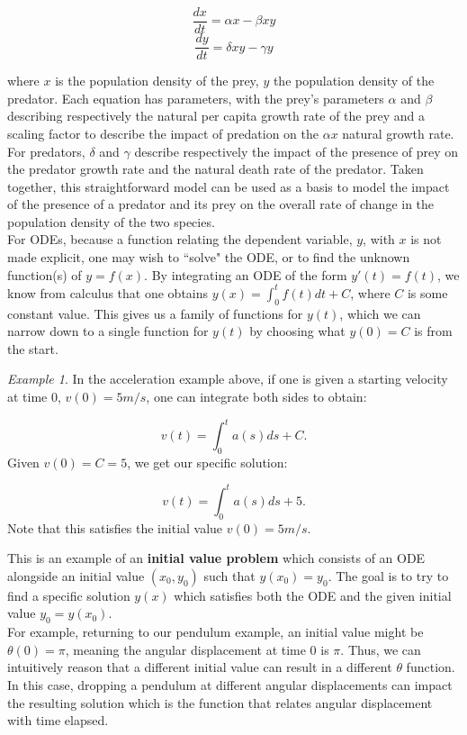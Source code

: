 \documentclass{article}
\theoremstyle{remark}
\newtheorem{example}{Example}
\begin{document}
$$\frac{dx}{dt} = \alpha x - \beta xy$$
$$\frac{dy}{dt} = \delta xy - \gamma y$$

\noindent where $x$ is the population density of the prey, $y$ the population density of the predator. Each equation has parameters, with the prey's parameters $\alpha$ and $\beta$ describing respectively the natural per capita growth rate of the prey and a scaling factor to describe the impact of predation on the $\alpha x$ natural growth rate. For predators, $\delta$ and $\gamma$ describe respectively the impact of the presence of prey on the predator growth rate and the natural death rate of the predator. Taken together, this straightforward model can be used as a basis to model the impact of the presence of a predator and its prey on the overall rate of change in the population density of the two species. \\

For ODEs, because a function relating the dependent variable, $y$, with $x$ is not made explicit, one may wish to ``solve" the ODE, or to find the unknown function(s) of $y=f(x)$. By integrating an ODE of the form $y'(t) = f(t)$, we know from calculus that one obtains $y(x) = \int_0^t f(t) dt + C$, where $C$ is some constant value. This  gives us a family of functions for $y(t)$, which we can narrow down to a single function for $y(t)$ by choosing what $y(0) = C$ is from the start.\\
\begin{example}
In the acceleration example above, if one is given a starting velocity at time 0, $v(0) = 5m/s$, one can integrate both sides to obtain:

$$v(t) = \int_0^ta(s)ds + C.$$
Given $ v(0) = C = 5$, we get our specific solution:

$$v(t) = \int_0^ta(s)ds + 5.$$
Note that this satisfies the initial value $v(0) = 5m/s$. 

\end{example}

This is an example of an \textbf{initial value problem} which consists of an ODE alongside an initial value $(x_0, y_0)$ such that $y(x_0) = y_0$. The goal is to try to find a specific solution $y(x)$ which satisfies  both the ODE and the given initial value $y_0 = y(x_0)$.  \\


For example, returning to our pendulum example, an initial value might be $\theta(0) = \pi$, meaning the angular displacement at time 0 is $\pi$. Thus, we can intuitively reason that a different initial value can result in a different $\theta$ function. In this case, dropping a pendulum at different angular displacements can impact the resulting solution which is the function that relates angular displacement with time elapsed. \\
\end{document}
